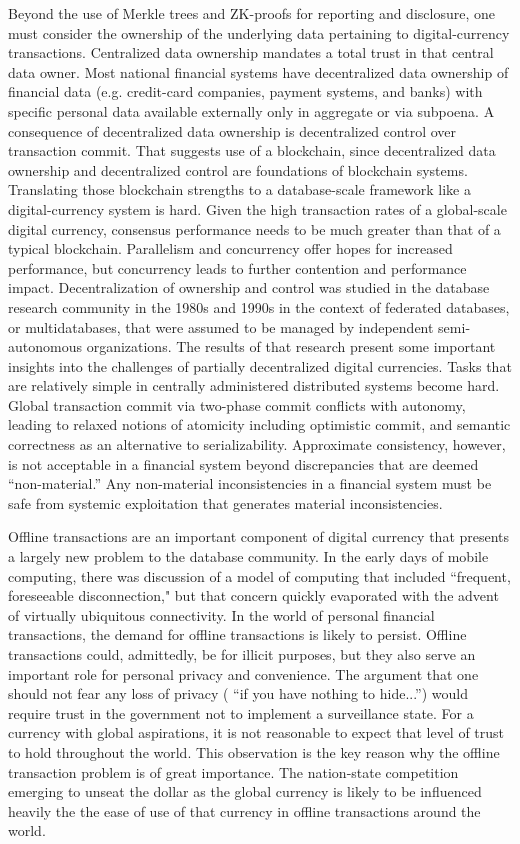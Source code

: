 \documentclass[11pt,dvipdfm]{article}
\begin{document}
Beyond the use of Merkle trees and ZK-proofs for reporting and disclosure,  one must consider the ownership
of the underlying data pertaining to digital-currency transactions.
Centralized data ownership mandates a total trust in that central data owner.  Most national financial systems
have decentralized data ownership of financial data (e.g. credit-card companies, payment systems, and banks) with specific
personal data available externally only in aggregate or via subpoena.  
A consequence of decentralized data ownership is decentralized control over transaction commit.
That suggests use of a blockchain, since decentralized data ownership and decentralized control are foundations of blockchain systems.
Translating those blockchain strengths to a database-scale framework like a digital-currency system is
hard.
Given the high transaction rates of a global-scale digital currency, consensus performance needs to be much
greater than that of a typical blockchain.
Parallelism and concurrency offer hopes for increased performance, but concurrency leads to further
contention and  performance impact.  
Decentralization of ownership and control was studied in the database research community in the 1980s
and 1990s in the context of federated databases, or multidatabases\cite{SIG92,Elmagarmid}, 
that were assumed to be managed by independent 
semi-autonomous organizations.   The results of that research present
some important insights into the challenges of partially decentralized digital currencies.  Tasks that are
relatively simple in centrally administered distributed systems become hard.  
Global transaction commit via two-phase commit conflicts with autonomy, leading to relaxed notions of
atomicity\cite{levyPODC} including optimistic commit, and semantic correctness as an alternative to
serializability.
Approximate consistency, however, is not acceptable in a financial system beyond discrepancies that are
deemed ``non-material.''  Any non-material inconsistencies in a financial system must be safe from 
systemic exploitation that generates material inconsistencies.

Offline transactions are an important  component of digital currency that presents a largely new problem to the database community.
In the early days of mobile computing, there was discussion of a model of computing that included ``frequent,
foreseeable disconnection,"\cite{RK93} but that concern quickly evaporated with the advent of virtually ubiquitous
connectivity.  In the world of personal financial transactions, the demand for offline transactions is likely to
persist.  Offline transactions could, admittedly, be for illicit purposes, but
they also serve an important role for personal privacy and convenience.  The argument that
one should not fear any loss of privacy ( ``if you have nothing to hide...'') would require trust in the government not to implement
a surveillance state.  For a currency with global aspirations, 
it is not reasonable to expect that level of trust to hold
throughout the world.
This  observation is the key reason why the offline transaction problem is of great importance.
The  nation-state competition emerging to unseat the dollar as the global currency is likely to be influenced
heavily the the ease of use of that currency in offline transactions around the world.
\end{document}
